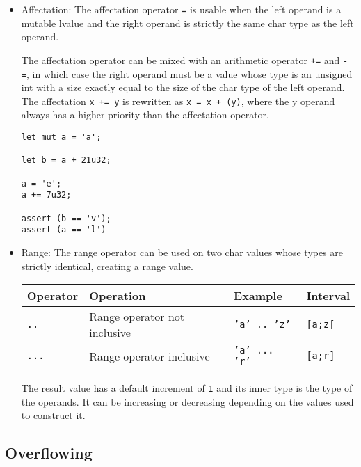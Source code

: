 \begin{itemize}
\item Affectation: The affectation operator \texttt{=} is usable when the left
  operand is a mutable lvalue and the right operand is strictly the same char
  type as the left operand.

  The affectation operator can be mixed with an arithmetic operator \texttt{+=}
  and \texttt{-=}, in which case the right operand must be a value whose type is
  an unsigned int with a size exactly equal to the size of the char type of the
  left operand. The affectation \texttt{x += y} is rewritten as \texttt{x = x +
    (y)}, where the y operand always has a higher priority than the affectation
  operator.

  \begin{lstlisting}[style=coloredverbatim]
let mut a = 'a';

let b = a + 21u32;

a = 'e';
a += 7u32;

assert (b == 'v');
assert (a == 'l')
  \end{lstlisting}

\item Range: The range operator can be used on two char values whose types are
  strictly identical, creating a range value.

  \begin{center}
    \vspace{-10pt}\begin{adjustbox}{max width=1.0\linewidth}
      \begin{tabular}{|l|lll|}
        \hline
        Operator & Operation & Example & Interval\\[0pt]
        \hline
        \hline
        \texttt{..} & Range operator not inclusive & \texttt{'a' .. 'z'} & \texttt{[a;z[}\\[0pt]
            \texttt{...} & Range operator inclusive & \texttt{'a' ... 'r'} & \texttt{[a;r]}\\[0pt]
            \hline
      \end{tabular}
  \end{adjustbox}\end{center}


  The result value has a default increment of \texttt{1} and its inner type is
  the type of the operands. It can be increasing or decreasing depending on the
  values used to construct it.

\end{itemize}

\subsection{Overflowing}
\label{sec:orga9c18c5}

